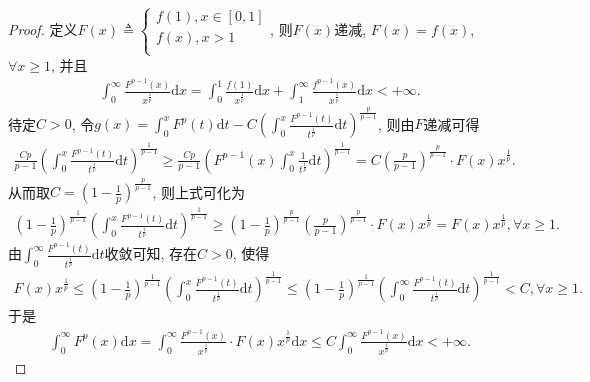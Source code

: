 \documentclass[../../main.tex]{subfiles}
\begin{document}
\begin{proof}
定义$F\left( x \right) \triangleq \begin{cases}
f\left( 1 \right) ,x\in \left[ 0,1 \right]\\
f\left( x \right) ,x>1\\
\end{cases}$, 则$F\left( x \right) $递减, $F\left( x \right) =f\left( x \right) $, $\forall x\geqslant 1$, 并且
\begin{align*}
\int_0^{\infty}{\frac{F^{p-1}\left( x \right)}{x^{\frac{1}{p}}}\mathrm{d}x}=\int_0^1{\frac{f\left( 1 \right)}{x^{\frac{1}{p}}}\mathrm{d}x}+\int_1^{\infty}{\frac{f^{p-1}\left( x \right)}{x^{\frac{1}{p}}}\mathrm{d}x}<+\infty .
\end{align*}
待定$C>0$, 令$g\left( x \right) =\int_0^x{F^p\left( t \right)}\mathrm{d}t-C\left( \int_0^x{\frac{F^{p-1}\left( t \right)}{t^{\frac{1}{p}}}\mathrm{d}t} \right) ^{\frac{p}{p-1}}$, 则由$F$递减可得
\begin{align*}
\frac{Cp}{p-1}\left( \int_0^x{\frac{F^{p-1}\left( t \right)}{t^{\frac{1}{p}}}\mathrm{d}t} \right) ^{\frac{1}{p-1}}\geqslant \frac{Cp}{p-1}\left( F^{p-1}\left( x \right) \int_0^x{\frac{1}{t^{\frac{1}{p}}}\mathrm{d}t} \right) ^{\frac{1}{p-1}}=C\left( \frac{p}{p-1} \right) ^{\frac{p}{p-1}}\cdot F\left( x \right) x^{\frac{1}{p}}.
\end{align*}
从而取$C=\left( 1-\frac{1}{p} \right) ^{\frac{p}{p-1}}$, 则上式可化为
\begin{align*}
\left( 1-\frac{1}{p} \right) ^{\frac{1}{p-1}}\left( \int_0^x{\frac{F^{p-1}\left( t \right)}{t^{\frac{1}{p}}}\mathrm{d}t} \right) ^{\frac{1}{p-1}}\geqslant \left( 1-\frac{1}{p} \right) ^{\frac{p}{p-1}}\left( \frac{p}{p-1} \right) ^{\frac{p}{p-1}}\cdot F\left( x \right) x^{\frac{1}{p}}=F\left( x \right) x^{\frac{1}{p}},\forall x\geqslant 1.
\end{align*}
由$\int_0^{\infty}{\frac{F^{p-1}\left( t \right)}{t^{\frac{1}{p}}}\mathrm{d}t}$收敛可知, 存在$C>0$, 使得
\begin{align*}
F\left( x \right) x^{\frac{1}{p}}\leqslant \left( 1-\frac{1}{p} \right) ^{\frac{1}{p-1}}\left( \int_0^x{\frac{F^{p-1}\left( t \right)}{t^{\frac{1}{p}}}\mathrm{d}t} \right) ^{\frac{1}{p-1}}\leqslant \left( 1-\frac{1}{p} \right) ^{\frac{1}{p-1}}\left( \int_0^{\infty}{\frac{F^{p-1}\left( t \right)}{t^{\frac{1}{p}}}\mathrm{d}t} \right) ^{\frac{1}{p-1}}<C,\forall x\geqslant 1.
\end{align*}
于是
\begin{align*}
\int_0^{\infty}{F^p\left( x \right)}\mathrm{d}x=\int_0^{\infty}{\frac{F^{p-1}\left( x \right)}{x^{\frac{1}{p}}}\cdot F\left( x \right) x^{\frac{1}{p}}\mathrm{d}x}\leqslant C\int_0^{\infty}{\frac{F^{p-1}\left( x \right)}{x^{\frac{1}{p}}}\mathrm{d}x}<+\infty .
\end{align*}

\end{proof}
\end{document}
